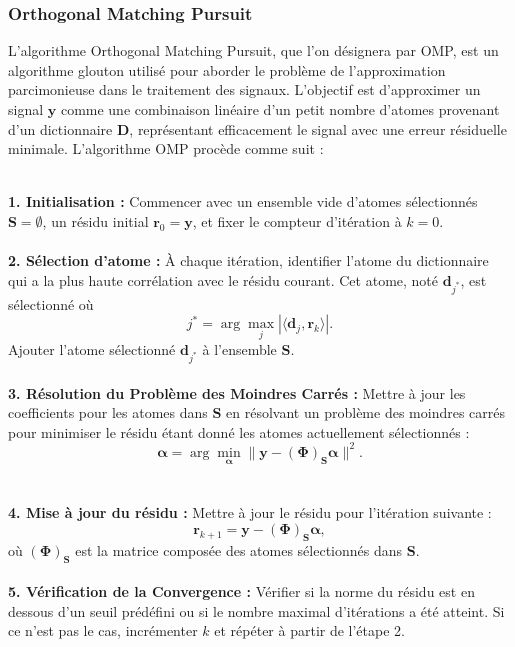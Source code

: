 \documentclass[9pt,a4paper,twoside]{rho}
\begin{document}
\subsubsection{Orthogonal Matching Pursuit}

L'algorithme Orthogonal Matching Pursuit, que l'on désignera par OMP, est un algorithme glouton utilisé pour aborder le problème de l'approximation parcimonieuse dans le traitement des signaux. L'objectif est d'approximer un signal $\mathbf{y}$ comme une combinaison linéaire d'un petit nombre d'atomes provenant d'un dictionnaire $\mathbf{D}$, représentant efficacement le signal avec une erreur résiduelle minimale. L'algorithme OMP procède comme suit :

\begin{rhoenv}[frametitle=Algorithme OMP]
\\
    \textbf{1. Initialisation :} Commencer avec un ensemble vide d'atomes sélectionnés $\mathbf{S} = \emptyset$, un résidu initial $\mathbf{r}_0 = \mathbf{y}$, et fixer le compteur d'itération à $k=0$.
\\\\
    \textbf{2. Sélection d'atome :} À chaque itération, identifier l'atome du dictionnaire qui a la plus haute corrélation avec le résidu courant. Cet atome, noté $\mathbf{d}_{j^*}$, est sélectionné où 
    \begin{equation}
        j^* = \arg \max_j |\langle \mathbf{d}_j, \mathbf{r}_k \rangle|.
    \end{equation}
    Ajouter l'atome sélectionné $\mathbf{d}_{j^*}$ à l'ensemble $\mathbf{S}$.
\\\\
    \textbf{3. Résolution du Problème des Moindres Carrés :} Mettre à jour les coefficients pour les atomes dans $\mathbf{S}$ en résolvant un problème des moindres carrés pour minimiser le résidu étant donné les atomes actuellement sélectionnés :
    \begin{equation}
        \boldsymbol{\alpha} = \arg \min_{\boldsymbol{\alpha}} \|\mathbf{y} - ( \boldsymbol{\Phi} )_{\mathbf{S}} \boldsymbol{\alpha}\|^2.
    \end{equation}
\\\\
    \textbf{4. Mise à jour du résidu :} Mettre à jour le résidu pour l'itération suivante :
    \begin{equation}
        \mathbf{r}_{k+1} = \mathbf{y} - ( \boldsymbol{\Phi} )_{\mathbf{S}} \boldsymbol{\alpha},
    \end{equation}
    où $( \boldsymbol{\Phi} )_{\mathbf{S}}$ est la matrice composée des atomes sélectionnés dans $\mathbf{S}$.
\\\\
    \textbf{5. Vérification de la Convergence :} Vérifier si la norme du résidu est en dessous d'un seuil prédéfini ou si le nombre maximal d'itérations a été atteint. Si ce n'est pas le cas, incrémenter $k$ et répéter à partir de l'étape 2.
\end{rhoenv}
\end{document}
